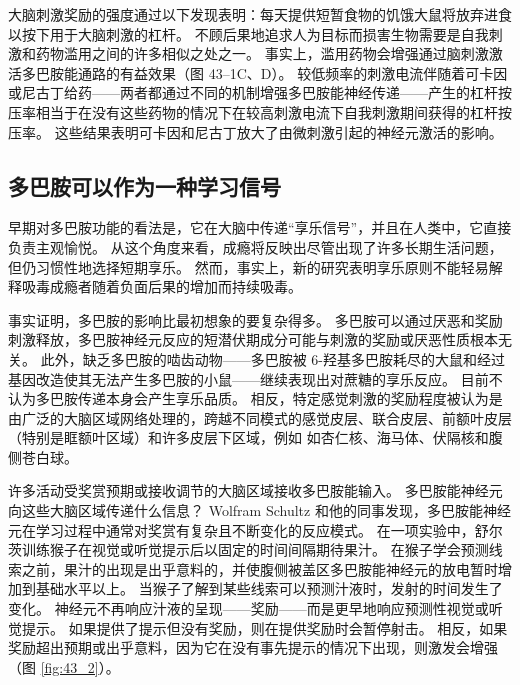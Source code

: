 大脑刺激奖励的强度通过以下发现表明：每天提供短暂食物的饥饿大鼠将放弃进食以按下用于大脑刺激的杠杆。 不顾后果地追求人为目标而损害生物需要是自我刺激和药物滥用之间的许多相似之处之一。 事实上，滥用药物会增强通过脑刺激激活多巴胺能通路的有益效果（图 43–1C、D）。 较低频率的刺激电流伴随着可卡因或尼古丁给药——两者都通过不同的机制增强多巴胺能神经传递——产生的杠杆按压率相当于在没有这些药物的情况下在较高刺激电流下自我刺激期间获得的杠杆按压率。 这些结果表明可卡因和尼古丁放大了由微刺激引起的神经元激活的影响。

\subsection{多巴胺可以作为一种学习信号}
早期对多巴胺功能的看法是，它在大脑中传递“享乐信号”，并且在人类中，它直接负责主观愉悦。 从这个角度来看，成瘾将反映出尽管出现了许多长期生活问题，但仍习惯性地选择短期享乐。 然而，事实上，新的研究表明享乐原则不能轻易解释吸毒成瘾者随着负面后果的增加而持续吸毒。

事实证明，多巴胺的影响比最初想象的要复杂得多。 多巴胺可以通过厌恶和奖励刺激释放，多巴胺神经元反应的短潜伏期成分可能与刺激的奖励或厌恶性质根本无关。 此外，缺乏多巴胺的啮齿动物——多巴胺被 6-羟基多巴胺耗尽的大鼠和经过基因改造使其无法产生多巴胺的小鼠——继续表现出对蔗糖的享乐反应。 目前不认为多巴胺传递本身会产生享乐品质。 相反，特定感觉刺激的奖励程度被认为是由广泛的大脑区域网络处理的，跨越不同模式的感觉皮层、联合皮层、前额叶皮层（特别是眶额叶区域）和许多皮层下区域，例如 如杏仁核、海马体、伏隔核和腹侧苍白球。

许多活动受奖赏预期或接收调节的大脑区域接收多巴胺能输入。 多巴胺能神经元向这些大脑区域传递什么信息？ Wolfram Schultz 和他的同事发现，多巴胺能神经元在学习过程中通常对奖赏有复杂且不断变化的反应模式。 在一项实验中，舒尔茨训练猴子在视觉或听觉提示后以固定的时间间隔期待果汁。 在猴子学会预测线索之前，果汁的出现是出乎意料的，并使腹侧被盖区多巴胺能神经元的放电暂时增加到基础水平以上。 当猴子了解到某些线索可以预测汁液时，发射的时间发生了变化。 神经元不再响应汁液的呈现——奖励——而是更早地响应预测性视觉或听觉提示。 如果提供了提示但没有奖励，则在提供奖励时会暂停射击。 
相反，如果奖励超出预期或出乎意料，因为它在没有事先提示的情况下出现，则激发会增强（图 \ref{fig:43_2}）。

